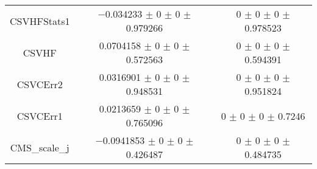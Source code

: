 \begin{table}
\begin{tabular}{ccc}
CSVHFStats1 & \num{-0.034233} $\pm$ \num{0} $\pm$ \num{0} $\pm$ \num{0.979266} & \num{0} $\pm$ \num{0} $\pm$ \num{0} $\pm$ \num{0.978523}\\
CSVHF & \num{0.0704158} $\pm$ \num{0} $\pm$ \num{0} $\pm$ \num{0.572563} & \num{0} $\pm$ \num{0} $\pm$ \num{0} $\pm$ \num{0.594391}\\
CSVCErr2 & \num{0.0316901} $\pm$ \num{0} $\pm$ \num{0} $\pm$ \num{0.948531} & \num{0} $\pm$ \num{0} $\pm$ \num{0} $\pm$ \num{0.951824}\\
CSVCErr1 & \num{0.0213659} $\pm$ \num{0} $\pm$ \num{0} $\pm$ \num{0.765096} & \num{0} $\pm$ \num{0} $\pm$ \num{0} $\pm$ \num{0.7246}\\
CMS\_scale\_j & \num{-0.0941853} $\pm$ \num{0} $\pm$ \num{0} $\pm$ \num{0.426487} & \num{0} $\pm$ \num{0} $\pm$ \num{0} $\pm$ \num{0.484735}\\
\bottomrule
\end{tabular}
\end{table}